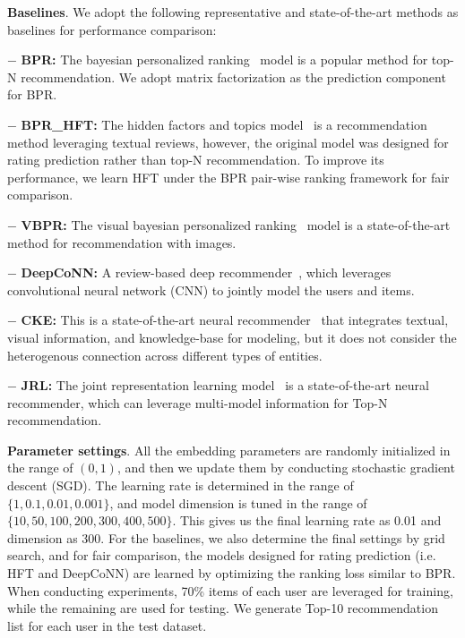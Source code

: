 \documentclass[algorithms,article,accept,moreauthors,pdftex,10pt,a4paper]{Definitions/mdpi}
\begin{document}
\noindent
\textbf{Baselines}. We adopt the following representative and state-of-the-art methods as baselines for performance comparison:


$-$ \textbf{BPR: } The bayesian personalized ranking~\cite{bpr} model is a popular method for top-N recommendation. We adopt matrix factorization as the prediction component for BPR.

$-$ \textbf{BPR\_HFT: } The hidden factors and topics model~\cite{mcauley2013hidden} is a recommendation method leveraging textual reviews, however, the original model was designed for rating prediction rather than top-N recommendation. To improve its performance, we learn HFT under the BPR pair-wise ranking framework for fair comparison.

$-$ \textbf{VBPR: } The visual bayesian personalized ranking~\cite{he2016vbpr} model is a state-of-the-art method for recommendation with images.

$-$ \textbf{DeepCoNN: } A review-based deep recommender~\cite{zheng2017joint}, which leverages convolutional neural network (CNN) to jointly model the users and items.

$-$ \textbf{CKE: } This is a state-of-the-art neural recommender~\cite{zhang2016collaborativekdd} that integrates textual, visual information, and knowledge-base for modeling, but it does not consider the heterogenous connection across different types of entities. 

$-$ \textbf{JRL: } The joint representation learning model~\cite{zhang2017joint} is a state-of-the-art neural recommender, which can leverage multi-model information for Top-N recommendation. 








\noindent
\textbf{Parameter settings}. 
All the embedding parameters are randomly initialized in the range of $(0,1)$, and then we update them by conducting stochastic gradient descent (SGD). 
The learning rate is determined in the range of $\{1,0.1,0.01,0.001\}$, and model dimension is tuned in the range of $\{10, 50, 100, 200, 300, 400, 500\}$. This gives us the final learning rate as 0.01 and dimension as 300.
For the baselines, we also determine the final settings by grid search, and for fair comparison, the models designed for rating prediction (i.e. HFT and DeepCoNN) are learned by optimizing the ranking loss similar to BPR. 
When conducting experiments, 70\% items of each user are leveraged for training, while the remaining are used for testing. We generate Top-10 recommendation list for each user in the test dataset.
\end{document}
